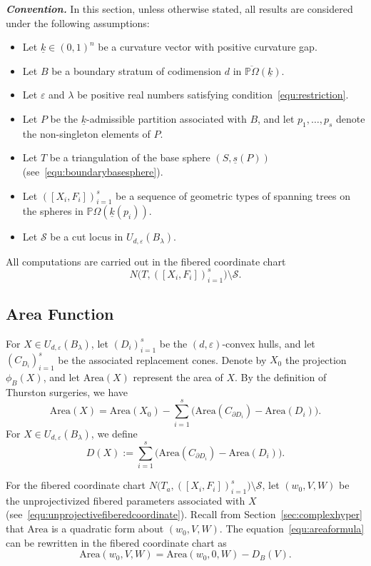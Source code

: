 \documentclass{compositio}
\numberwithin{equation}{section}
\numberwithin{figure}{section}
\theoremstyle{definition}
\theoremstyle{plain}
\begin{document}
{\noindent\textit{\textbf{Convention.}} In this section, unless otherwise stated, all results are considered under the following assumptions:
\begin{itemize}
    \item Let $\underline{k} \in (0,1)^n$ be a curvature vector with positive curvature gap.
    \item Let $B$ be a boundary stratum of codimension $d$ in $\overline{\mathbb{P}\Omega}(\underline{k})$.
    \item Let $\varepsilon$ and $\lambda$ be positive real numbers satisfying condition~\eqref{equ:restriction}.
    \item Let $P$ be the $\underline{k}$-admissible partition associated with $B$, and let $p_1,\ldots,p_s$ denote the non-singleton elements of $P$.
    \item Let $T$ be a triangulation of the base sphere $(S,\underline{s}(P))$ (see~\eqref{equ:boundarybasesphere}).
    \item Let $([X_i, F_i])_{i=1}^s$ be a sequence of geometric types of spanning trees on the spheres in $\mathbb{P}\Omega(\underline{k}(p_i))$.
    \item Let $\mathcal{S}$ be a cut locus in $U_{d,\varepsilon}(B_{\lambda})$.
\end{itemize}
All computations are carried out in the fibered coordinate chart
$$
N\big(T, ([X_i, F_i])_{i=1}^s\big) \setminus \mathcal{S}.
$$


\subsection{Area Function}
For $X \in U_{d,\varepsilon}(B_{\lambda})$, let $(D_i)_{i=1}^s$ be the $(d,\varepsilon)$-convex hulls, and let $(C_{D_i})_{i=1}^s$ be the associated replacement cones. Denote by $X_0$ the projection $\phi_B(X)$, and let $\mathrm{Area}(X)$ represent the area of $X$. By the definition of Thurston surgeries, we have
\begin{equation}\label{equ:areaformula}
    \mathrm{Area}(X) = \mathrm{Area}(X_0) - \sum_{i=1}^s \Big(\mathrm{Area}(C_{\partial D_i}) - \mathrm{Area}(D_i)\Big).
\end{equation}
For $X \in U_{d,\varepsilon}(B_{\lambda})$, we define
\begin{equation}\label{equ:defB}
    D(X) := \sum_{i=1}^s \Big(\mathrm{Area}(C_{\partial D_i}) - \mathrm{Area}(D_i)\Big).
\end{equation}

For the fibered coordinate chart $N\big(T_a, ([X_i, F_i])_{i=1}^s\big) \setminus \mathcal{S}$,
let $(w_0, V, W)$ be the unprojectivized fibered parameters associated with $X$ (see~\eqref{equ:unprojectivefiberedcoordinate}). Recall from Section~\ref{sec:complexhyper} that $\mathrm{Area}$ is a quadratic form about $(w_0, V, W)$. The equation~\eqref{equ:areaformula} can be rewritten in the fibered coordinate chart as
\begin{equation}\label{equ:defdv}
    \mathrm{Area}(w_0, V, W) = \mathrm{Area}(w_0, 0, W) - D_B(V).
\end{equation}

}
\end{document}
